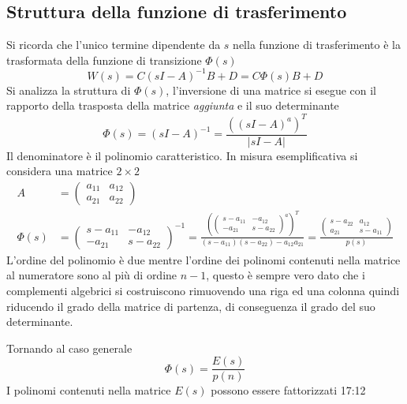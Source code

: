 \subsection{Struttura della funzione di trasferimento}
Si ricorda che l'unico termine dipendente da $s$ nella funzione di
trasferimento è la trasformata della funzione di transizione $\Phi(s)$
$$
W(s) = C(sI-A)^{-1} B +D = C\Phi(s) B+D
$$
Si analizza la struttura di $\Phi(s)$, l'inversione di una matrice si esegue
con il rapporto della trasposta della matrice \textit{aggiunta} e il suo
determinante
$$
\Phi(s) = (sI-A)^{-1} = \frac{\left(\left(sI-A\right)^a\right)^T}{|sI-A|}
$$
Il denominatore è il polinomio caratteristico.
\newpage
In misura esemplificativa si considera una matrice $2\times2$
$$\begin{aligned}
A&=\begin{pmatrix}
   a_{11} & a_{12} \\
   a_{21} & a_{22}
  \end{pmatrix}\\
  \Phi(s) &=
\begin{pmatrix}
 s-a_{11} & -a_{12} \\
 -a_{21} & s-a_{22}
\end{pmatrix}^{-1} =
\frac{\left(\begin{pmatrix}
 s-a_{11} & -a_{12} \\
 -a_{21} & s-a_{22}
\end{pmatrix}^a\right)^T}{(s-a_{11})(s-a_{22})-a_{12}a_{21}}
= \frac{\begin{pmatrix}
           s-a_{22} & a_{12} \\
           a_{21} & s-a_{11}
         \end{pmatrix}
}{p(s)}
\end{aligned}$$
L'ordine del polinomio è due mentre l'ordine dei polinomi contenuti nella
matrice al numeratore sono al più di ordine $n-1$, questo è sempre vero dato
che i complementi algebrici si costruiscono rimuovendo una riga ed
una colonna quindi riducendo il grado della matrice di partenza, di conseguenza
il grado del suo determinante.

Tornando al caso generale
$$
\Phi(s) = \frac{E(s)}{p(n)}
$$
I polinomi contenuti nella matrice $E(s)$ possono essere fattorizzati
17:12
